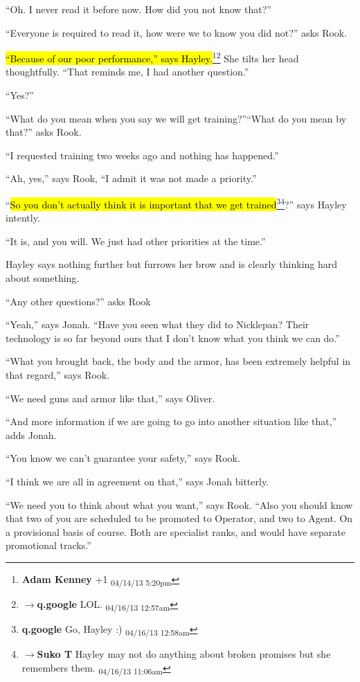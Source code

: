 ``Oh.  I never read it before now.  How did you not know that?''

``Everyone is required to read it, how were we to know you did not?'' asks Rook.

\hl{``Because of our poor performance,'' says Hayley.}\footnote{\textbf{Adam Kenney }+1 \textsubscript{04/14/13 5:20pm}}\footnote{$\rightarrow$\textbf{q.google }LOL. \textsubscript{04/16/13 12:57am}}  She tilts her head thoughtfully. ``That reminds me, I had another question.''

``Yes?''

``What do you mean when you say we will get training?''``What do you mean by that?'' asks Rook.

``I requested training two weeks ago and nothing has happened.''

``Ah, yes,'' says Rook, ``I admit it was not made a priority.''

``\hl{So you don't actually think it is important that we get trained}\footnote{\textbf{q.google }Go, Hayley :) \textsubscript{04/16/13 12:58am}}\footnote{$\rightarrow$\textbf{Suko T }Hayley may not do anything about broken promises but she remembers them. \textsubscript{04/16/13 11:06am}}?'' says Hayley intently.

``It is, and you will.  We just had other priorities at the time.''

Hayley says nothing further but furrows her brow and is clearly thinking hard about something.



``Any other questions?'' asks Rook

``Yeah,'' says Jonah.  ``Have you seen what they did to Nicklepan? Their technology is so far beyond ours that I don't know what you think we can do.''

``What you brought back, the body and the armor, has been extremely helpful in that regard,'' says Rook.

``We need guns and armor like that,'' says Oliver.

``And more information if we are going to go into another situation like that,'' adds Jonah.

``You know we can't guarantee your safety,'' says Rook.

``I think we are all in agreement on that,'' says Jonah bitterly.



``We need you to think about what you want,'' says Rook.  ``Also you should know that two of you are scheduled to be promoted to Operator, and two to Agent. On a provisional basis of course.  Both are specialist ranks, and would have separate promotional tracks.''

